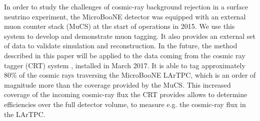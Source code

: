\documentclass[a4paper,11pt]{article}
\begin{document}
In order to study the challenges of cosmic-ray background rejection in a surface neutrino experiment, the MicroBooNE detector was equipped with an external muon counter stack (MuCS) at the start of operations in 2015. We use this system to develop and demonstrate muon tagging. It also provides an external set of data to validate simulation and reconstruction.
In the future, the method described in this paper will be applied to the data coming from the cosmic ray tagger (CRT) system \cite{crt}, installed in March 2017. It is able to tag approximately $80\%$ of the cosmic rays traversing the MicroBooNE LArTPC, which is an order of magnitude more than the coverage provided by the MuCS. This increased coverage of the incoming cosmic-ray flux the CRT provides allows to determine efficiencies over the full detector volume, to measure e.g. the cosmic-ray flux in the LArTPC. %


\end{document}
